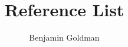 \documentclass{article}
\author{Benjamin Goldman}
\title{Reference List}
\begin{document}
\nocite{*}

\end{document}
